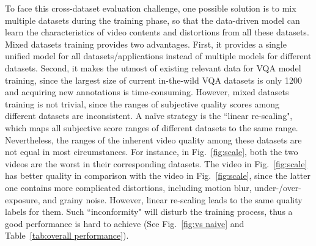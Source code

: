 \documentclass[twocolumn]{svjour3}          \smartqed  \usepackage{graphicx}
\begin{document}
To face this cross-dataset evaluation challenge, one possible solution is to mix multiple datasets during the training phase, so that the data-driven model can learn the characteristics of video contents and distortions from all these datasets. 
Mixed datasets training provides two advantages. 
First, it provides a single unified model for all datasets/applications instead of multiple models for different datasets. 
Second, it makes the utmost of existing relevant data for VQA model training, since the largest size of current in-the-wild VQA datasets is only 1200 and acquiring new annotations is time-consuming. 
However, mixed datasets training is not trivial, since the ranges of subjective quality scores among different datasets are inconsistent. 
A na\"ive strategy is the ``linear re-scaling", which maps all subjective score ranges of different datasets to the same range.
Nevertheless, the ranges of the inherent video quality among these datasets are not equal in most circumstances. 
For instance, in Fig.~\ref{fig:scale}, both the two videos are the worst in their corresponding datasets. 
The video in Fig.~\ref{fig:scale} has better quality in comparison with the video in Fig.~\ref{fig:scale}, since the latter one contains more complicated distortions, including motion blur, under-/over-exposure, and grainy noise.
However, linear re-scaling leads to the same quality labels for them. 
Such ``inconformity" will disturb the training process, thus a good performance is hard to achieve (See Fig.~\ref{fig:vs naive} and Table~\ref{tab:overall performance}).
\end{document}
